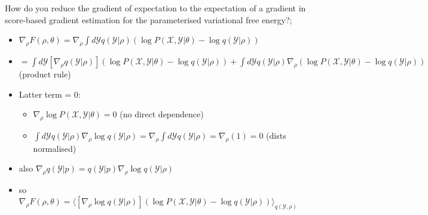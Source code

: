 \documentclass{article}
\begin{document}
How do you reduce the gradient of expectation to the expectation of a gradient in score-based gradient estimation for the parameterised variational free energy?; \begin{itemize}
    \item $\nabla_\rho F(\rho, \theta) = \nabla_\rho \int d\mathcal{Y}q(\mathcal{Y}|\rho)(\log P(\mathcal{X, Y}|\theta) - \log q(\mathcal{Y}|\rho))$
    \item $= \int d\mathcal{Y}[\nabla_{\rho}q(\mathcal{Y}|\rho)](\log P(\mathcal{X, Y}|\theta) - \log q(\mathcal{Y}|\rho)) + \int d\mathcal{Y} q(\mathcal{Y}|\rho)\nabla_\rho(\log P(\mathcal{X, Y}|\theta) - \log q(\mathcal{Y}|\rho))$ (product rule)
    \item Latter term = 0: \begin{itemize}
        \item $\nabla_\rho\log P(\mathcal{X, Y}|\theta) = 0$ (no direct dependence)
        \item $\int d\mathcal{Y}q(\mathcal{Y}|\rho)\nabla_\rho \log q(\mathcal{Y}|\rho) = \nabla_\rho \int d\mathcal{Y}q(\mathcal{Y}|\rho) = \nabla_\rho (1) = 0$ (dists normalised)
    \end{itemize}
    \item also $\nabla_\rho q(\mathcal{Y}|p) = q(\mathcal{Y}|p)\nabla_\rho \log q(\mathcal{Y}|\rho)$
    \item so $\nabla_\rho F(\rho, \theta) = \langle [\nabla_{\rho}\log q(\mathcal{Y}|\rho)](\log P(\mathcal{X, Y}|\theta) - \log q(\mathcal{Y}|\rho)) \rangle_{q(\mathcal{Y}, \rho)}$
\end{itemize}
\end{document}
